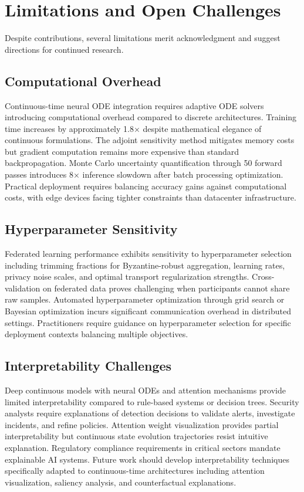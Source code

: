 \section*{Limitations and Open Challenges}

Despite contributions, several limitations merit acknowledgment and suggest directions for continued research.

\subsection*{Computational Overhead}

Continuous-time neural ODE integration requires adaptive ODE solvers introducing computational overhead compared to discrete architectures. Training time increases by approximately 1.8× despite mathematical elegance of continuous formulations. The adjoint sensitivity method mitigates memory costs but gradient computation remains more expensive than standard backpropagation. Monte Carlo uncertainty quantification through 50 forward passes introduces 8× inference slowdown after batch processing optimization. Practical deployment requires balancing accuracy gains against computational costs, with edge devices facing tighter constraints than datacenter infrastructure.

\subsection*{Hyperparameter Sensitivity}

Federated learning performance exhibits sensitivity to hyperparameter selection including trimming fractions for Byzantine-robust aggregation, learning rates, privacy noise scales, and optimal transport regularization strengths. Cross-validation on federated data proves challenging when participants cannot share raw samples. Automated hyperparameter optimization through grid search or Bayesian optimization incurs significant communication overhead in distributed settings. Practitioners require guidance on hyperparameter selection for specific deployment contexts balancing multiple objectives.

\subsection*{Interpretability Challenges}

Deep continuous models with neural ODEs and attention mechanisms provide limited interpretability compared to rule-based systems or decision trees. Security analysts require explanations of detection decisions to validate alerts, investigate incidents, and refine policies. Attention weight visualization provides partial interpretability but continuous state evolution trajectories resist intuitive explanation. Regulatory compliance requirements in critical sectors mandate explainable AI systems. Future work should develop interpretability techniques specifically adapted to continuous-time architectures including attention visualization, saliency analysis, and counterfactual explanations.


